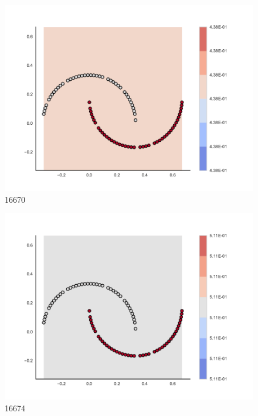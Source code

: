 \begin{subfigure}[b]{0.09\textwidth}
    \includegraphics[clip, trim=2.35cm 1.75cm 4.5cm 0cm,width=\textwidth]{img/convergence/16670.pdf}
    \caption{16670}
    \label{fig:convergence_16670}
\end{subfigure}
%
\begin{subfigure}[b]{0.09\textwidth}
    \includegraphics[clip, trim=2.35cm 1.75cm 4.5cm 0cm,width=\textwidth]{img/convergence/16674.pdf}
    \caption{16674}
    \label{fig:convergence_16674}
\end{subfigure}
%
